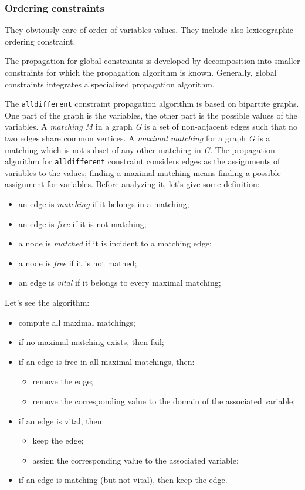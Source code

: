 \documentclass[10pt,a4paper]{article}
\begin{document}
\subsubsection{Ordering constraints}
They obviously care of order of variables values. They include also
lexicographic ordering constraint.

The propagation for global constraints is developed by decomposition into
smaller constraints for which the propagation algorithm is known. Generally,
global constraints integrates a specialized propagation algorithm.

The \texttt{alldifferent} constraint propagation algorithm is based on bipartite
graphs. One part of the graph is the variables, the other part is the possible
values of the variables. A \textit{matching M} in a graph \textit{G} is a set of
non-adjacent edges such that no two edges share common vertices. A
\textit{maximal matching} for a graph \textit{G} is a matching which is not
subset of any other matching in \textit{G}. The propagation algorithm for
\texttt{alldifferent} constraint considers edges as the assignments of variables
to the values; finding a maximal matching means finding a possible assignment
for variables. Before analyzing it, let's give some definition:

\begin{itemize}
    \item an edge is \textit{matching} if it belongs in a matching;
    \item an edge is \textit{free} if it is not matching;
    \item a node is \textit{matched} if it is incident to a matching edge;
    \item a node is \textit{free} if it is not mathed;
    \item an edge is \textit{vital} if it belongs to every maximal matching;
\end{itemize}

Let's see the algorithm:

\begin{itemize}
    \item compute all maximal matchings;
    \item if no maximal matching exists, then fail;
    \item if an edge is free in all maximal matchings, then:
    \begin{itemize}
        \item remove the edge;
        \item remove the corresponding value to the domain of the associated
        variable;
    \end{itemize}
    \item if an edge is vital, then:
    \begin{itemize}
        \item keep the edge;
        \item assign the corresponding value to the associated variable;
    \end{itemize}
    \item if an edge is matching (but not vital), then keep the edge.
\end{itemize}
\end{document}
